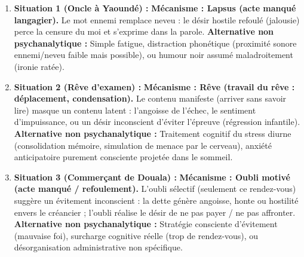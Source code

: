 \documentclass[11pt]{article}
\begin{document}
\begin{corrige}
\begin{enumerate}
\item \textbf{Situation 1 (Oncle à Yaoundé) :} \textbf{Mécanisme : Lapsus (acte manqué langagier).} Le mot \guillemotleft ennemi \guillemotright remplace \guillemotleft neveu \guillemotright : le désir hostile refoulé (jalousie) perce la censure du moi et s'exprime dans la parole. \textbf{Alternative non psychanalytique :} Simple fatigue, distraction phonétique (proximité sonore \guillemotleft ennemi/neveu \guillemotright faible mais possible), ou humour noir assumé maladroitement (ironie ratée).
\item \textbf{Situation 2 (Rêve d'examen) :} \textbf{Mécanisme : Rêve (travail du rêve : déplacement, condensation).} Le contenu manifeste (arriver sans savoir lire) masque un contenu latent : l'angoisse de l'échec, le sentiment d'impuissance, ou un désir inconscient d'éviter l'épreuve (régression infantile). \textbf{Alternative non psychanalytique :} Traitement cognitif du stress diurne (consolidation mémoire, simulation de menace par le cerveau), anxiété anticipatoire purement consciente projetée dans le sommeil.
\item \textbf{Situation 3 (Commerçant de Douala) :} \textbf{Mécanisme : Oubli motivé (acte manqué / refoulement).} L'oubli sélectif (seulement ce rendez-vous) suggère un évitement inconscient : la dette génère angoisse, honte ou hostilité envers le créancier ; l'oubli réalise le désir de ne pas payer / ne pas affronter. \textbf{Alternative non psychanalytique :} Stratégie consciente d'évitement (mauvaise foi), surcharge cognitive réelle (trop de rendez-vous), ou désorganisation administrative non spécifique.
\end{enumerate}
\end{corrige}
\end{document}
